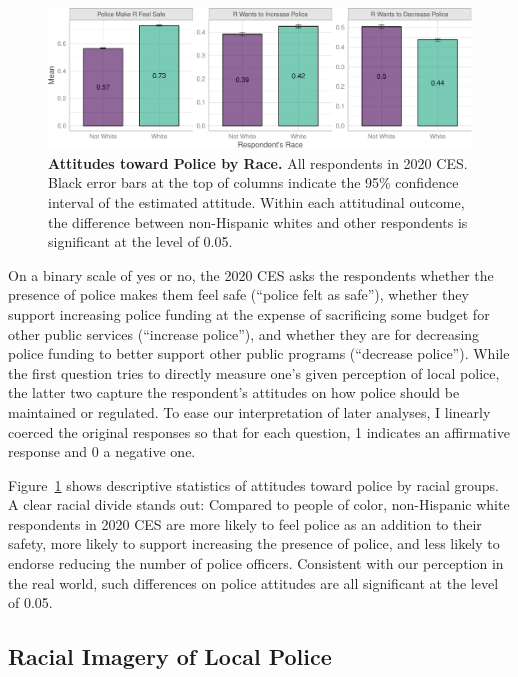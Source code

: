 \documentclass[
  12pt,
]{article}
\begin{document}
\begin{figure}[tb]

{\centering \includegraphics{racialized-police_files/figure-pdf/fig-attitudes-1.pdf}

}

\caption{\label{fig-attitudes}\textbf{Attitudes toward Police by Race.}
All respondents in 2020 CES. Black error bars at the top of columns
indicate the 95\% confidence interval of the estimated attitude. Within
each attitudinal outcome, the difference between non-Hispanic whites and
other respondents is significant at the level of 0.05.}

\end{figure}

On a binary scale of yes or no, the 2020 CES asks the respondents
whether the presence of police makes them feel safe (``police felt as
safe''), whether they support increasing police funding at the expense
of sacrificing some budget for other public services (``increase
police''), and whether they are for decreasing police funding to better
support other public programs (``decrease police''). While the first
question tries to directly measure one's given perception of local
police, the latter two capture the respondent's attitudes on how police
should be maintained or regulated. To ease our interpretation of later
analyses, I linearly coerced the original responses so that for each
question, 1 indicates an affirmative response and 0 a negative one.

Figure~\ref{fig-attitudes} shows descriptive statistics of attitudes
toward police by racial groups. A clear racial divide stands out:
Compared to people of color, non-Hispanic white respondents in 2020 CES
are more likely to feel police as an addition to their safety, more
likely to support increasing the presence of police, and less likely to
endorse reducing the number of police officers. Consistent with our
perception in the real world, such differences on police attitudes are
all significant at the level of 0.05.

\hypertarget{racial-imagery-of-local-police}{%
\subsection{Racial Imagery of Local
Police}\label{racial-imagery-of-local-police}}
\end{document}
